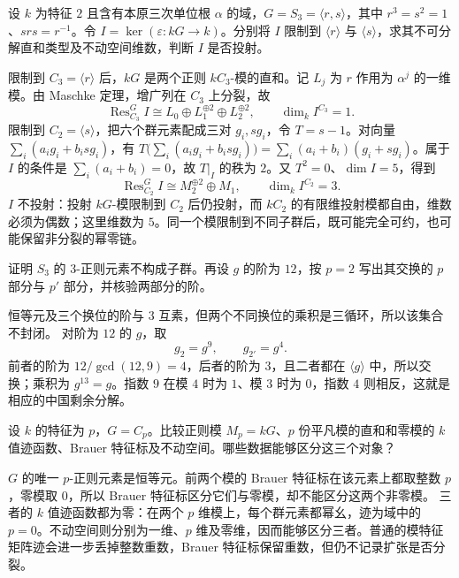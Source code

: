 \begin{optionalexercise}\label{b5:ex:08-s3-augmentation}
	设 \(k\) 为特征 \(2\) 且含有本原三次单位根 \(\alpha\) 的域，\(G=S_3=\langle r,s\rangle\)，其中 \(r^3=s^2=1\)、\(srs=r^{-1}\)。令 \(I=\ker(\varepsilon:kG\to k)\)。分别将 \(I\) 限制到 \(\langle r\rangle\) 与 \(\langle s\rangle\)，求其不可分解直和类型及不动空间维数，判断 \(I\) 是否投射。
\end{optionalexercise}
\begin{solution}
	限制到 \(C_3=\langle r\rangle\) 后，\(kG\) 是两个正则 \(kC_3\)-模的直和。记 \(L_j\) 为 \(r\) 作用为 \(\alpha^j\) 的一维模。由 Maschke 定理，增广列在 \(C_3\) 上分裂，故
	\[
		\operatorname{Res}_{C_3}^G I\cong L_0\oplus L_1^{\oplus2}\oplus L_2^{\oplus2}, \qquad \dim_k I^{C_3}=1.
	\]
	限制到 \(C_2=\langle s\rangle\)，把六个群元素配成三对 \(g_i,sg_i\)，令 \(T=s-1\)。对向量 \(\sum_i(a_ig_i+b_isg_i)\)，有 \(T\bigl(\sum_i(a_ig_i+b_isg_i)\bigr)=\sum_i(a_i+b_i)(g_i+sg_i)\)。属于 \(I\) 的条件是 \(\sum_i(a_i+b_i)=0\)，故 \(T|_I\) 的秩为 \(2\)。又 \(T^2=0\)、\(\dim I=5\)，得到
	\[
		\operatorname{Res}_{C_2}^G I\cong M_2^{\oplus2}\oplus M_1, \qquad \dim_k I^{C_2}=3.
	\]
	\(I\) 不投射：投射 \(kG\)-模限制到 \(C_2\) 后仍投射，而 \(kC_2\) 的有限维投射模都自由，维数必须为偶数；这里维数为 \(5\)。同一个模限制到不同子群后，既可能完全可约，也可能保留非分裂的幂零链。
\end{solution}

\begin{optionalexercise}\label{b5:ex:08-regular-set-and-parts}
	证明 \(S_3\) 的 \(3\)-正则元素不构成子群。再设 \(g\) 的阶为 \(12\)，按 \(p=2\) 写出其交换的 \(p\) 部分与 \(p'\) 部分，并核验两部分的阶。
\end{optionalexercise}
\begin{solution}
	恒等元及三个换位的阶与 \(3\) 互素，但两个不同换位的乘积是三循环，所以该集合不封闭。 对阶为 \(12\) 的 \(g\)，取
	\[
		g_2=g^9,\qquad g_{2'}=g^4.
	\]
	前者的阶为 \(12/\gcd(12,9)=4\)，后者的阶为 \(3\)，且二者都在 \(\langle g\rangle\) 中，所以交换；乘积为 \(g^{13}=g\)。指数 \(9\) 在模 \(4\) 时为 \(1\)、模 \(3\) 时为 \(0\)，指数 \(4\) 则相反，这就是相应的中国剩余分解。
\end{solution}

\begin{optionalexercise}\label{b5:ex:08-trace-brauer-distinction}
	设 \(k\) 的特征为 \(p\)，\(G=C_p\)。比较正则模 \(M_p=kG\)、\(p\) 份平凡模的直和和零模的 \(k\) 值迹函数、Brauer 特征标及不动空间。哪些数据能够区分这三个对象？
\end{optionalexercise}
\begin{solution}
	\(G\) 的唯一 \(p\)-正则元素是恒等元。前两个模的 Brauer 特征标在该元素上都取整数 \(p\)，零模取 \(0\)，所以 Brauer 特征标区分它们与零模，却不能区分这两个非零模。 三者的 \(k\) 值迹函数都为零：在两个 \(p\) 维模上，每个群元素都幂幺，迹为域中的 \(p=0\)。不动空间则分别为一维、\(p\) 维及零维，因而能够区分三者。普通的模特征矩阵迹会进一步丢掉整数重数，Brauer 特征标保留重数，但仍不记录扩张是否分裂。
\end{solution}

